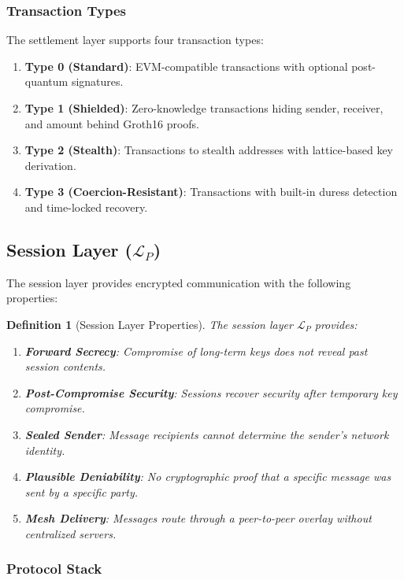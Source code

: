 \documentclass[11pt,a4paper,twocolumn]{article}
\newtheorem{definition}[theorem]{Definition}
\begin{document}
\subsubsection{Transaction Types}

The settlement layer supports four transaction types:

\begin{enumerate}[leftmargin=*]
  \item \textbf{Type 0 (Standard)}: EVM-compatible transactions with optional post-quantum signatures.
  \item \textbf{Type 1 (Shielded)}: Zero-knowledge transactions hiding sender, receiver, and amount behind Groth16 proofs.
  \item \textbf{Type 2 (Stealth)}: Transactions to stealth addresses with lattice-based key derivation.
  \item \textbf{Type 3 (Coercion-Resistant)}: Transactions with built-in duress detection and time-locked recovery.
\end{enumerate}

\subsection{Session Layer ($\mathcal{L}_P$)}

The session layer provides encrypted communication with the following properties:

\begin{definition}[Session Layer Properties]
The session layer $\mathcal{L}_P$ provides:
\begin{enumerate}
  \item \textbf{Forward Secrecy}: Compromise of long-term keys does not reveal past session contents.
  \item \textbf{Post-Compromise Security}: Sessions recover security after temporary key compromise.
  \item \textbf{Sealed Sender}: Message recipients cannot determine the sender's network identity.
  \item \textbf{Plausible Deniability}: No cryptographic proof that a specific message was sent by a specific party.
  \item \textbf{Mesh Delivery}: Messages route through a peer-to-peer overlay without centralized servers.
\end{enumerate}
\end{definition}

\subsubsection{Protocol Stack}
\end{document}
